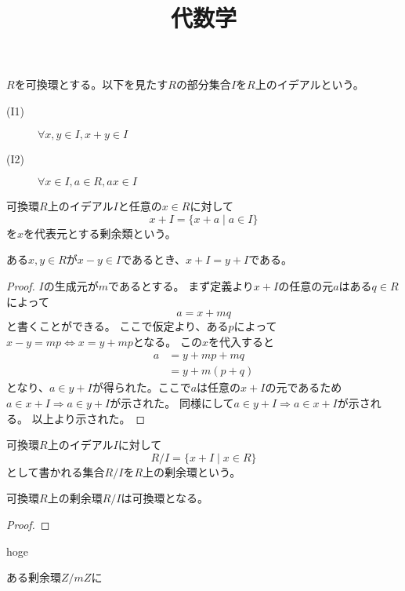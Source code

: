 \documentclass[uplatex, 11pt, a4j, dvipdfmx]{jsarticle}
\title{代数学}
\author{}
\date{}
\begin{document}
\maketitle

  \begin{dfn}[イデアル]
    $R$を可換環とする。以下を見たす$R$の部分集合$I$を$R$上のイデアルという。
    \begin{description}
      \item[(I1)] $\forall x, y\in I, x + y \in I$
      \item[(I2)] $\forall x\in I, a \in R, a x \in I$
    \end{description}
  \end{dfn}

  \begin{dfn}[剰余類]
    可換環$R$上のイデアル$I$と任意の$x \in R$に対して
    \begin{equation}
      x + I = \{ x + a \mid a \in I \}
    \end{equation}
    を$x$を代表元とする剰余類という。
  \end{dfn}

  \begin{thm}
    ある$x, y \in R$が$x - y \in I$であるとき、$x + I = y + I$である。
    \begin{proof}
      $I$の生成元が$m$であるとする。
      まず定義より$x + I$の任意の元$a$はある$q \in R$によって
      \begin{equation}
        a = x + m q
      \end{equation}
      と書くことができる。
      ここで仮定より、ある$p$によって$x - y = m p \Leftrightarrow x = y + m p$となる。
      この$x$を代入すると
      \begin{align}
        a &= y + m p + m q \\
          &= y + m (p + q)
      \end{align}
      となり、$a \in y + I$が得られた。ここで$a$は任意の$x + I$の元であるため$a \in x + I \Rightarrow a \in y + I$が示された。
      同様にして$a \in y + I \Rightarrow a \in x + I$が示される。
      以上より示された。
    \end{proof}
  \end{thm}



  \begin{dfn}[剰余環]
    可換環$R$上のイデアル$I$に対して
    \begin{equation}
      R/I = \{ x + I \mid x \in R \}
    \end{equation}
    として書かれる集合$R/I$を$R$上の剰余環という。
  \end{dfn}

  \begin{thm}
    可換環$R$上の剰余環$R/I$は可換環となる。
    \begin{proof}
    \end{proof}
  \end{thm}


  \begin{thm}
    hoge
  \end{thm}


  \begin{thm}
    ある剰余環$Z/mZ$に
  \end{thm}
\end{document}
